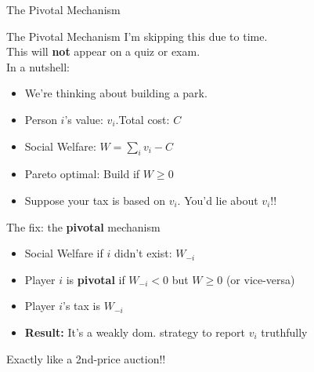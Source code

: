 

\begin{frame}[standout]
The Pivotal Mechanism
\end{frame}

\begin{frame}{The Pivotal Mechanism}
I'm skipping this due to time.\\
This will \textbf{not} appear on a quiz or exam.\\
In a nutshell:
\begin{itemize}
    \item We're thinking about building a park. 
    \item Person $i$'s value: $v_i$.\hspace{0.5in}Total cost: $C$
    \item Social Welfare: $W = \sum_i v_i - C$
    \item Pareto optimal: Build if $W\geq 0$
    \item Suppose your tax is based on $v_i$. You'd lie about $v_i$!!
\end{itemize}
The fix: the \textbf{pivotal} mechanism
\begin{itemize}
    \item Social Welfare if $i$ didn't exist: $W_{-i}$
    \item Player $i$ is \textbf{pivotal} if $W_{-i}<0$ but $W\geq 0$ (or vice-versa)
    \item Player $i$'s tax is $W_{-i}$
    \item \textbf{Result:} It's a weakly dom. strategy to report $v_i$ truthfully
\end{itemize}
Exactly like a 2nd-price auction!!
\end{frame}

